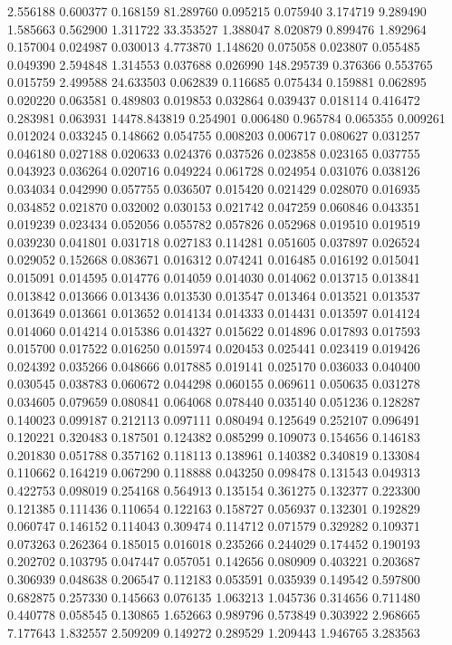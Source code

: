 2.556188
0.600377
0.168159
81.289760
0.095215
0.075940
3.174719
9.289490
1.585663
0.562900
1.311722
33.353527
1.388047
8.020879
0.899476
1.892964
0.157004
0.024987
0.030013
4.773870
1.148620
0.075058
0.023807
0.055485
0.049390
2.594848
1.314553
0.037688
0.026990
148.295739
0.376366
0.553765
0.015759
2.499588
24.633503
0.062839
0.116685
0.075434
0.159881
0.062895
0.020220
0.063581
0.489803
0.019853
0.032864
0.039437
0.018114
0.416472
0.283981
0.063931
14478.843819
0.254901
0.006480
0.965784
0.065355
0.009261
0.012024
0.033245
0.148662
0.054755
0.008203
0.006717
0.080627
0.031257
0.046180
0.027188
0.020633
0.024376
0.037526
0.023858
0.023165
0.037755
0.043923
0.036264
0.020716
0.049224
0.061728
0.024954
0.031076
0.038126
0.034034
0.042990
0.057755
0.036507
0.015420
0.021429
0.028070
0.016935
0.034852
0.021870
0.032002
0.030153
0.021742
0.047259
0.060846
0.043351
0.019239
0.023434
0.052056
0.055782
0.057826
0.052968
0.019510
0.019519
0.039230
0.041801
0.031718
0.027183
0.114281
0.051605
0.037897
0.026524
0.029052
0.152668
0.083671
0.016312
0.074241
0.016485
0.016192
0.015041
0.015091
0.014595
0.014776
0.014059
0.014030
0.014062
0.013715
0.013841
0.013842
0.013666
0.013436
0.013530
0.013547
0.013464
0.013521
0.013537
0.013649
0.013661
0.013652
0.014134
0.014333
0.014431
0.013597
0.014124
0.014060
0.014214
0.015386
0.014327
0.015622
0.014896
0.017893
0.017593
0.015700
0.017522
0.016250
0.015974
0.020453
0.025441
0.023419
0.019426
0.024392
0.035266
0.048666
0.017885
0.019141
0.025170
0.036033
0.040400
0.030545
0.038783
0.060672
0.044298
0.060155
0.069611
0.050635
0.031278
0.034605
0.079659
0.080841
0.064068
0.078440
0.035140
0.051236
0.128287
0.140023
0.099187
0.212113
0.097111
0.080494
0.125649
0.252107
0.096491
0.120221
0.320483
0.187501
0.124382
0.085299
0.109073
0.154656
0.146183
0.201830
0.051788
0.357162
0.118113
0.138961
0.140382
0.340819
0.133084
0.110662
0.164219
0.067290
0.118888
0.043250
0.098478
0.131543
0.049313
0.422753
0.098019
0.254168
0.564913
0.135154
0.361275
0.132377
0.223300
0.121385
0.111436
0.110654
0.122163
0.158727
0.056937
0.132301
0.192829
0.060747
0.146152
0.114043
0.309474
0.114712
0.071579
0.329282
0.109371
0.073263
0.262364
0.185015
0.016018
0.235266
0.244029
0.174452
0.190193
0.202702
0.103795
0.047447
0.057051
0.142656
0.080909
0.403221
0.203687
0.306939
0.048638
0.206547
0.112183
0.053591
0.035939
0.149542
0.597800
0.682875
0.257330
0.145663
0.076135
1.063213
1.045736
0.314656
0.711480
0.440778
0.058545
0.130865
1.652663
0.989796
0.573849
0.303922
2.968665
7.177643
1.832557
2.509209
0.149272
0.289529
1.209443
1.946765
3.283563
